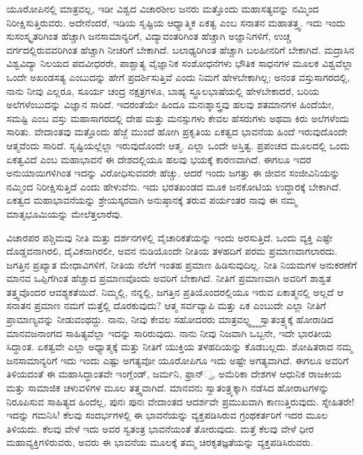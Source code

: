 ಯೂರೋಪಿನಲ್ಲಿ ಮಾತ್ರವಲ್ಲ, ಇಡೀ ವಿಶ್ವದ ವಿಚಾರಶೀಲ ಜನರು ಮತ್ತೊಂದು ಮಹಾಸತ್ಯವನ್ನು ನಮ್ಮಿಂದ ನಿರೀಕ್ಷಿಸುತ್ತಿರುವರು. ಅದೇನೆಂದರೆ, ಇಡಿಯ ಸೃಷ್ಟಿಯ ಆಧ್ಯಾತ್ಮಿಕ ಏಕತ್ವ ಎಂಬ ಸನಾತನ ಮಹಾತತ್ತ್ವ. ಇದು ಇಂದು ಸುಸಂಸ್ಕೃತರಿಗಿಂತ ಹೆಚ್ಚಾಗಿ ಜನಸಾಮಾನ್ಯರಿಗೆ, ವಿದ್ಯಾವಂತರಿಗಿಂತ ಹೆಚ್ಚಾಗಿ ಅಜ್ಞಾನಿಗಳಿಗೆ, ಉಚ್ಚ ವರ್ಗದಲ್ಲಿರುವವರಿಗಿಂತ ಹೆಚ್ಚಾಗಿ ನೀಚರಿಗೆ ಬೇಕಾಗಿದೆ. ಬಲಾಢ್ಯರಿಗಿಂತ ಹೆಚ್ಚಾಗಿ ಬಲಹೀನರಿಗೆ ಬೇಕಾಗಿದೆ. ಮದ್ರಾಸಿನ ವಿಶ್ವವಿದ್ಯಾ ನಿಲಯದ ಪದವೀಧರರೇ, ಪಾಶ್ಚಾತ್ಯ ವೈಜ್ಞಾನಿಕ ಸಂಶೋಧನೆಗಳು ಭೌತಿಕ ಸಾಧನಗಳ ಮೂಲಕ ವಿಶ್ವವೆಲ್ಲಾ ಒಂದೇ ಅಖಂಡಸತ್ಯ ಎಂಬುದನ್ನು ಹೇಗೆ ಪ್ರದರ್ಶಿಸುತ್ತಿವೆ ಎಂದು ನಿಮಗೆ ಹೇಳಬೇಕಾಗಿಲ್ಲ; ಅನಂತ ವಸ್ತುಸಾಗರದಲ್ಲಿ, ನಾನು ನೀವು ಎಲ್ಲರೂ, ಸೂರ್ಯ ಚಂದ್ರ ನಕ್ಷತ್ರಗಳೂ, ಬಾಹ್ಯ ಸ್ಥೂಲಭಾಷೆಯಲ್ಲಿ ಹೇಳಬೇಕಾದರೆ, ಬರಿಯ ಅಲೆಗಳೆಂಬುದನ್ನು ವಿಜ್ಞಾನ ಸಾರಿದೆ. ಇದರಂತೆಯೇ ಹಿಂದೂ ಮನಃಶ್ಶಾಸ್ತ್ರವು ಹಲವು ಶತಮಾನಗಳ ಹಿಂದೆಯೇ, ಸಮಷ್ಟಿ ಎಂಬ ವಸ್ತು ಮಹಾಸಾಗರದಲ್ಲಿ ದೇಹ ಮತ್ತು ಮನಸ್ಸುಗಳು ಕೇವಲ ಹೆಸರುಗಳು ಅಥವಾ ಕಿರು ಅಲೆಗಳೆಂದು ಸಾರಿತು. ವೇದಾಂತವು ಮತ್ತೊಂದು ಹೆಜ್ಜೆ ಮುಂದೆ ಹೋಗಿ ಪ್ರಕೃತಿಯ ಏಕತ್ವದ ಭಾವನೆಯ ಹಿಂದೆ ಇರುವುದೊಂದೇ ಆತ್ಮವೆಂದು ಸಾರಿದೆ. ಸೃಷ್ಟಿಯಲ್ಲೆಲ್ಲಾ ಇರುವುದೊಂದೇ ಆತ್ಮ. ಎಲ್ಲಾ ಒಂದೇ ಅಸ್ತಿತ್ವ. ಪ್ರಪಂಚದ ಮೂಲದಲ್ಲಿ ಒಂದು ಏಕತ್ವವಿದೆ ಎಂಬ ಮಹಾಭಾವನೆ ಈ ದೇಶದಲ್ಲಿಯೂ ಹಲವು ಭಯಕ್ಕೆ ಕಾರಣವಾಗಿದೆ. ಈಗಲೂ ಇದರ ಅನುಯಾಯಿಗಳಿಗಿಂತ ಇದನ್ನು ವಿರೋಧಿಸುವವರೇ ಹೆಚ್ಚು. ಆದರೆ ಇಂದು ಜಗತ್ತು ಈ ಜೀವನ ಸಂಜೀವಿನಿಯನ್ನು ನಮ್ಮಿಂದ ನಿರೀಕ್ಷಿಸುತ್ತಿದೆ ಎಂದು ಹೇಳುವೆನು. ಇದು ಭರತಖಂಡದ ಮೂಕ ಜನಕೋಟಿಯ ಉದ್ಧಾರಕ್ಕೆ ಬೇಕಾಗಿದೆ. ಏಕತ್ವದ ಮಹಾಭಾವನೆಯನ್ನು ಶ್ರೇಯಸ್ಕರವಾಗಿ ಅನುಷ್ಠಾನಕ್ಕೆ ತರುವ ಪರ್ಯಂತರ ನಾವು ಈ ನಮ್ಮ ಮಾತೃಭೂಮಿಯನ್ನು ಮೇಲೆತ್ತಲಾರೆವು. 

ವಿಚಾರಪರ ಪಶ್ಚಿಮವು ನೀತಿ ಮತ್ತು ದರ್ಶನಗಳಲ್ಲಿ ವೈಚಾರಿಕತೆಯನ್ನು ಇಂದು ಅರಸುತ್ತಿದೆ. ಒಂದು ವ್ಯಕ್ತಿ ಎಷ್ಟೇ ದೊಡ್ಡವನಾಗಿರಲಿ, ದೈವಿಕನಾಗಿರಲೀ, ಅವನ ನುಡಿಯೊಂದೇ ನೀತಿಯ ತಳಹದಿಗೆ ಪರಮ ಪ್ರಮಾಣವಾಗಲಾರದು. ಜಗತ್ತಿನ ಪ್ರಖ್ಯಾತ ಮೇಧಾವಿಗಳಿಗೆ, ನೀತಿಯ ನೆಲೆಗೆ ಇಂತಹ ಪ್ರಮಾಣ ಹಿಡಿಸುವುದಿಲ್ಲ. ನೀತಿ ನಿಯಮಗಳ ಅನುಕರಣೆಗೆ ಮಾನವ ಒಪ್ಪಿಗೆಗಿಂತ ಹೆಚ್ಚಾದ ಪ್ರಮಾಣವೊಂದು ಅವರಿಗೆ ಬೇಕಾಗಿದೆ. ನೀತಿಗೆ ಪ್ರಮಾಣವಾಗಿ ಅವರಿಗೆ ಶಾಶ್ವತ ತತ್ತ್ವವೊಂದರ ಆವಶ್ಯಕತೆಯಿದೆ. ನಿಮ್ಮಲ್ಲಿ, ನನ್ನಲ್ಲಿ, ಜಗತ್ತಿನ ಪ್ರತಿಯೊಂದರಲ್ಲಿಯೂ ಇರುವ ಏಕಾತ್ಮನಲ್ಲಿ ಅಲ್ಲದೆ ಆ ಸನಾತನ ಪ್ರಮಾಣ ನಮಗೆ ಮತ್ತೆಲ್ಲಿ ದೊರಕುವುದು? ಆತ್ಮ ಸರ್ವವ್ಯಾಪಿ ಮತ್ತು ಏಕ ಎಂಬುದೇ ಎಲ್ಲಾ ನೀತಿಗೆ ಪ್ರಾಮಾಣ್ಯವನ್ನು ನೀಡುವಂಥದ್ದು. ನಾನು, ನೀವು ಕೇವಲ ಸಹೋದರರು ಮಾತ್ರವಲ್ಲ್ಧ್ಧ್ಧ್ಧ ಸ್ವಾತಂತ್ರ್ಯಕ್ಕೆ ಹೋರಾಡಿದ ಮಾನವಜನಾಂಗದ ಸಾಹಿತ್ಯವೆಲ್ಲಾ ಇದನ್ನು ಸಾರಿರುವುದು. ನಾನು ನೀವು ನಿಜವಾಗಿ ಒಬ್ಬನೇ, ಇದೇ ಭಾರತೀಯ ಸಿದ್ಧಾಂತ. ಏಕತ್ವವೇ ಎಲ್ಲಾ ಅಧ್ಯಾತ್ಮಕ್ಕೆ ಮತ್ತು ನೀತಿಗೆ ಯುಕ್ತಿಯ ತಳಹದಿಯನ್ನು ಕೊಡಬಲ್ಲದು. ಶೋಷಿತರಾದ ನಮ್ಮ ಜನಸಾಮಾನ್ಯರಿಗೆ ಇದು ಇಂದು ಎಷ್ಟು ಅಗತ್ಯವೋ ಯೂರೋಪಿಗೂ ಇದು ಅಷ್ಟೇ ಅಗತ್ಯವಾಗಿದೆ. ಈಗಲೂ ಅವರಿಗೆ ತಿಳಿಯದಂತೆ ಈ ಮಹಾಸಿದ್ಧಾಂತವೇ ಇಂಗ್ಲೆಂಡ್​, ಜರ್ಮನಿ, ಫ್ರಾನ್​್ಸ, ಅಮೆರಿಕಾ ದೇಶಗಳ ಆಧುನಿಕ ರಾಜಕೀಯ ಮತ್ತು ಸಾಮಾಜಿಕ ಚಳುವಳಿಗಳ ಮೂಲ ತತ್ತ್ವವಾಗಿದೆ. ಮಾನವನು ಸ್ವಾತಂತ್ರ್ಯಕ್ಕಾಗಿ ನಡೆಸಿದ ಹೋರಾಟಗಳನ್ನು ನಿರೂಪಿಸುವ ಸಾಹಿತ್ಯದ ಹಿಂದೆಲ್ಲ, ಪುನಃ ಪುನಃ ವೇದಾಂತದ ಆದರ್ಶವೇ ಪ್ರಮುಖವಾಗಿ ಕಾಣುತ್ತಿರುವುದು. ಸ್ನೇಹಿತರೇ! ಇದನ್ನು ಗಮನಿಸಿ! ಕೆಲವು ಸಂದರ್ಭಗಳಲ್ಲಿ ಈ ಭಾವನೆಯನ್ನು ವ್ಯಕ್ತಪಡಿಸಿರುವ ಗ್ರಂಥಕರ್ತರಿಗೆ ಇದರ ಮೂಲ ತಿಳಿಯದು. ಕೆಲವು ವೇಳೆ ಇದು ಅವರ ಸ್ವತಂತ್ರ ಭಾವನೆಯಂತೆ ತೋರುವುದು. ಮತ್ತೆ ಕೆಲವು ವೇಳೆ ಧೀರ ಮಹಾವ್ಯಕ್ತಿಗಳಿರುವರು, ಅವರು ಈ ಭಾವನೆಯ ಮೂಲಕ್ಕೆ ತಮ್ಮ ಚಿರಕೃತಜ್ಞತೆಯನ್ನು ವ್ಯಕ್ತಪಡಿಸಿರುವರು. 

